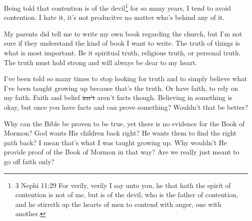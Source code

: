 Being told that contention is of the devil\footnote{
3 Nephi 11:29 For verily, verily I say unto you, he that hath the spirit of 
contention is not of me, but is of the devil, who is the father of contention, 
and he stirreth up the hearts of men to contend with anger, one with another.
} for so many years, I tend to avoid contention. I hate it, it's not producitve no 
matter who's behind any of it.

My parents did tell me to write my own book regarding the church, but I'm not sure if
they understand the kind of book I want to write. The truth of things is what is most
important. Be it spiritual truth, religious truth, or personal truth. The truth must
hold strong and will always be dear to my heart.

I've been told so many times to stop looking for truth and to simply believe what
I've been taught growing up because that's the truth. Or have faith, to rely on my
faith. Faith and belief \st{isn't} aren't facts though. Believing in something is 
okay, but once you have facts and can prove something? Wouldn't that be better?

Why can the Bible be proven to be true, yet there is no evidence for the Book of
Mormon? God wants His children back right? He wants them to find the right path back?
I mean that's what I was taught growing up. Why wouldn't He provide proof of the Book
of Mormon in that way? Are we really just meant to go off faith only?